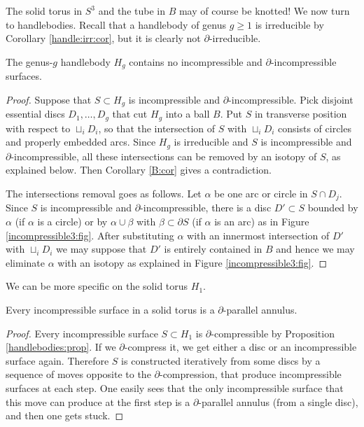 The solid torus in $S^3$ and the tube in $B$ may of course be knotted! We now turn to handlebodies. Recall that a handlebody of genus $g\geq 1$ is irreducible by Corollary \ref{handle:irr:cor}, but it is clearly not $\partial$-irreducible.

\begin{prop}[Handlebodies] \label{handlebodies:prop}
The genus-$g$ handlebody $H_g$ contains no incompressible and $\partial$-incompressible surfaces.
\end{prop}
\begin{proof}
Suppose that $S\subset H_g$ is incompressible and $\partial$-incompressible. Pick disjoint essential discs $D_1,\ldots, D_g$ that cut $H_g$ into a ball $B$. Put $S$ in transverse position with respect to $\sqcup_i D_i$, so that the intersection of $S$ with $\sqcup_i D_i$ consists of circles and properly embedded arcs. Since $H_g$ is irreducible and $S$ is incompressible and $\partial$-incompressible, all these intersections can be removed by an isotopy of $S$, as explained below. Then Corollary \ref{B:cor} gives a contradiction.

The intersections removal goes as follows. Let $\alpha$ be one arc or circle in $S \cap D_j$. Since $S$ is incompressible and $\partial$-incompressible, there is a disc $D'\subset S$ bounded by $\alpha$ (if $\alpha$ is a circle) or by $\alpha \cup \beta$ with $\beta\subset \partial S$ (if $\alpha$ is an arc) as in Figure \ref{incompressible3:fig}. After substituting $\alpha$ with an innermost intersection of $D'$ with $\sqcup_i D_i$ we may suppose that $D'$ is entirely contained in $B$ and hence we may eliminate $\alpha$ with an isotopy as explained in Figure \ref{incompressible3:fig}. 
\end{proof}

We can be more specific on the solid torus $H_1$.

\begin{prop} \label{incompressible:solid:torus:prop}
Every incompressible surface in a solid torus is a $\partial$-parallel annulus.
\end{prop}
\begin{proof}
Every incompressible surface $S\subset H_1$ is $\partial$-compressible by Proposition \ref{handlebodies:prop}. If we $\partial$-compress it, we get either a disc or an incompressible surface again. Therefore $S$ is constructed iteratively from some discs by a sequence of moves opposite to the $\partial$-compression, that produce incompressible surfaces at each step. 
One easily sees that the only incompressible surface that this move can produce at the first step is a $\partial$-parallel annulus (from a single disc), and then one gets stuck.
\end{proof}

